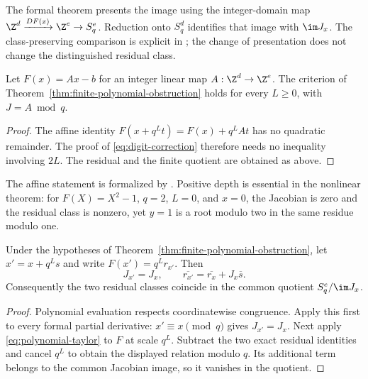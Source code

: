 The formal theorem
presents the image using the integer-domain map
$\Z^d\xrightarrow{DF(x)}\Z^e\to S_q^e$. Reduction onto $S_q^d$ identifies
that image with $\im J_x$. The class-preserving comparison is explicit in
; the change of
presentation does not change the distinguished residual class.

\begin{proposition}\label{prop:affine-obstruction}
Let $F(x)=Ax-b$ for an integer linear map $A:\Z^d\to\Z^e$. The criterion
of Theorem~\ref{thm:finite-polynomial-obstruction} holds for every $L\ge0$,
with $J=A\bmod q$.
\end{proposition}

\begin{proof}
The affine identity
$F(x+q^Lt)=F(x)+q^LAt$ has no quadratic remainder. The proof of
\eqref{eq:digit-correction} therefore needs no inequality involving $2L$.
The residual and the finite quotient are obtained as above.
\end{proof}

The affine statement is formalized by
.
Positive depth is essential in the nonlinear theorem: for $F(X)=X^2-1$,
$q=2$, $L=0$, and $x=0$, the Jacobian is zero and the residual class is
nonzero, yet $y=1$ is a root modulo two in the same residue modulo one.

\begin{proposition}
\label{prop:representative-independence}
Under the hypotheses of Theorem~\ref{thm:finite-polynomial-obstruction},
let $x'=x+q^Ls$ and write $F(x')=q^Lr_{x'}$. Then
\[
 J_{x'}=J_x,\qquad
 \overline{r_{x'}}=\overline{r_x}+J_x\overline s.
\]
Consequently the two residual classes coincide in the common quotient
$S_q^e/\im J_x$.
\end{proposition}

\begin{proof}
Polynomial evaluation respects coordinatewise congruence. Apply this first
to every formal partial derivative: $x'\equiv x\pmod q$ gives
$J_{x'}=J_x$. Next apply \eqref{eq:polynomial-taylor} to $F$ at scale $q^L$.
Subtract the two exact residual identities and cancel $q^L$ to obtain the
displayed relation modulo $q$. Its additional term belongs to the common
Jacobian image, so it vanishes in the quotient.
\end{proof}

